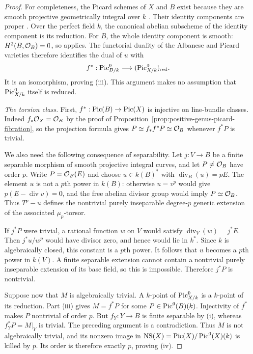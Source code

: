 \begin{proof}
For completeness, the Picard schemes of $X$ and $B$ exist
because they are smooth projective geometrically integral
over $k$
\cite[Expos\'e~232, Theorem~3.1, pp.~148--149;
proof in Sections~4--5, pp.~150--155]{FGAPicard}.
Their identity components are proper
\cite[Expos\'e~236, Theorem~2.1(ii), pp.~231--232]{FGAPicard}.
Over the perfect field $k$, the canonical abelian subscheme
of the identity component is its reduction.
For $B$, the whole identity component is smooth:
$H^2(B,\mathcal O_B)=0$, so
\cite[Expos\'e~236, Proposition~2.10(ii), pp.~235--236]{FGAPicard}
applies.
The functorial duality of the Albanese and Picard varieties
therefore identifies the dual of $u$ with
\[
 f^*:\operatorname{Pic}^0_{B/k}\longrightarrow(\operatorname{Pic}^0_{X/k})_{\mathrm{red}}.
\]
It is an isomorphism, proving (iii).
This argument makes no assumption that $\operatorname{Pic}^0_{X/k}$ itself
is reduced.

\emph{The torsion class.}
First, $f^*:\operatorname{Pic}(B)\to\operatorname{Pic}(X)$ is injective on line-bundle
classes. Indeed $f_*\mathcal O_X=\mathcal O_B$ by the proof of
Proposition~\ref{prop:positive-genus-picard-fibration}, so the
projection formula gives
$P\simeq f_*f^*P\simeq\mathcal O_B$ whenever $f^*P$ is trivial.

We also need the following consequence of separability.
Let $j:V\to B$ be a finite separable morphism of smooth
projective integral curves, and let $P\ne\mathcal O_B$ have order $p$.
Write $P=\mathcal O_B(E)$ and choose $u\in k(B)^*$ with
$\operatorname{div}_B(u)=pE$.
The element $u$ is not a $p$th power in $k(B)$:
otherwise $u=v^p$ would give
$p(E-\operatorname{div}v)=0$, and the free abelian divisor
group would imply $P\simeq\mathcal O_B$.
Thus $T^p-u$ defines the nontrivial purely inseparable
degree-$p$ generic extension of the associated $\mu_p$-torsor.

If $j^*P$ were trivial, a rational function $w$ on $V$ would
satisfy $\operatorname{div}_V(w)=j^*E$.
Then $j^*u/w^p$ would have divisor zero, and hence would lie
in $k^*$. Since $k$ is algebraically closed, this constant is
a $p$th power. It follows that $u$ becomes a $p$th power in
$k(V)$.
A finite separable extension cannot contain a nontrivial
purely inseparable extension of its base field, so this is
impossible. Therefore $j^*P$ is nontrivial.

Suppose now that $M$ is algebraically trivial.
A $k$-point of $\operatorname{Pic}^0_{X/k}$ is a $k$-point of its reduction.
Part (iii) gives $M=f^*P$ for some $P\in\operatorname{Pic}^0(B)(k)$.
Injectivity of $f^*$ makes $P$ nontrivial of order $p$.
But $f_Y:Y\to B$ is finite separable by (i), whereas
$f_Y^*P=M|_Y$ is trivial. The preceding argument is a
contradiction.
Thus $M$ is not algebraically trivial, and its nonzero image in
$\operatorname{NS}(X)=\operatorname{Pic}(X)/\operatorname{Pic}^0(X)(k)$ is killed by $p$.
Its order is therefore exactly $p$, proving (iv).


\end{proof}

